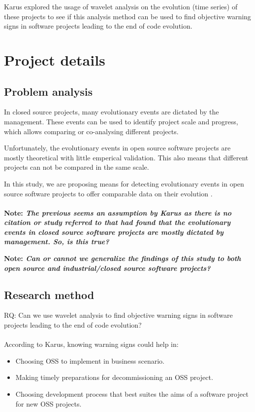 \documentclass[9pt,a4paper]{article}
\begin{document}
Karus explored the usage of wavelet analysis on the evolution (time series) of
these projects to see if this analysis method can be used to find objective
warning signs in software projects leading to the end of code evolution.

\section{Project details}

\subsection{Problem analysis}
In closed source projects, many evolutionary events are dictated by the
management. These events can be used to identify project scale and progress,
which allows comparing or co-analysing different projects.

Unfortunately, the evolutionary events in open source software projects are
mostly theoretical with little emperical validation. This also means that
different projects can not be compared in the same scale.

In this study, we are proposing means for detecting evolutionary events in open
source software projects to offer comparable data on their evolution
\cite{karus2013}.

\paragraph{}
\bf{Note: }\rm \emph{The previous seems an assumption by Karus as there is no
citation or study referred to that had found that the evolutionary events in closed source
software projects are mostly dictated by management. So, is this true?}

\bf{Note: }\rm \emph{Can or cannot we generalize the findings of this study to
both open source and industrial/closed source software projects?}

\subsection{Research method}
RQ: Can we use wavelet analysis to find objective warning signs in software
projects leading to the end of code evolution? \cite{karus2013}

\paragraph{}
According to Karus, knowing warning signs could help in:
\begin{itemize}
	\item Choosing OSS to implement in business scenario.
	\item Making timely preparations for decommissioning an OSS project.
	\item Choosing development process that best suites the aims of a software
	project for new OSS projects.
\end{itemize}
\end{document}
